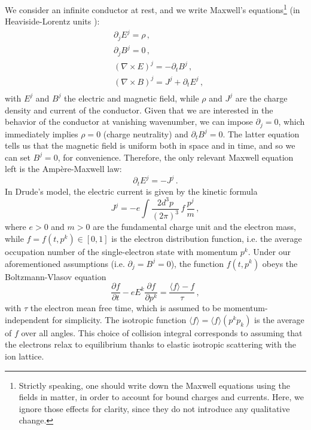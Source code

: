 \documentclass[a4paper, amsfonts, amssymb, amsmath, reprint, showkeys, nofootinbib, twoside,notitlepage,onecolumn]{revtex4-1}
\theoremstyle{definition}
\theoremstyle{theorem}
\begin{document}
We consider an infinite conductor at rest, and we write Maxwell's equations\footnote{Strictly speaking, one should write down the Maxwell equations using the fields in matter, in order to account for bound charges and currents. Here, we ignore those effects for clarity, since they do not introduce any qualitative change.} (in Heaviside-Lorentz units \cite[\S 54]{Srednicki_2007}):
\begin{equation}\label{maxwellone}
\begin{split}
& \partial_j E^j=\rho \, , \\
& \partial_j B^j=0 \, , \\
& (\nabla \times E)^j =-\partial_t B^j \, , \\
& (\nabla \times B)^j =J^j +\partial_t E^j \, , \\
\end{split}
\end{equation}
with $E^j$ and $B^j$ the electric and magnetic field, while $\rho$ and $J^j$ are the charge density and current of the conductor.
Given that we are interested in the behavior of the conductor at vanishing wavenumber, we can impose $\partial_j = 0$, which immediately implies $\rho = 0$ (charge neutrality) and $\partial_t B^j = 0$. The latter equation tells us that the magnetic field is uniform both in space and in time, and so we can set $B^j = 0$, for convenience. Therefore, the only relevant Maxwell equation left is the Amp\`{e}re-Maxwell law:
\begin{equation}\label{amperemaxwell}
\partial_t E^j=-J^j \, .
\end{equation}
In Drude's model, the electric current is given by the kinetic formula
\begin{equation}
J^j =-e \int \dfrac{2d^3 p}{(2\pi)^3} \,  f \, \dfrac{p^j}{m} \, ,
\end{equation}
where $e>0$ and $m>0$ are the fundamental charge unit and the electron mass, while $f=f(t,p^k)\in [0,1]$ is the electron distribution function, i.e. the average occupation number of the single-electron state with momentum $p^k$. Under our aforementioned assumptions (i.e. $\partial_j=B^j=0$), the function $f(t,p^k)$ obeys the Boltzmann-Vlasov equation
\begin{equation}\label{boltzmannVlasov}
\dfrac{\partial f}{\partial t}-eE^k \dfrac{\partial f}{\partial p^k} =\dfrac{\langle f\rangle -f}{\tau} \, ,
\end{equation}
with $\tau$ the electron mean free time, which is assumed to be momentum-independent for simplicity. The isotropic function $\langle f\rangle=\langle f\rangle (p^k p_k)$ is the average of $f$ over all angles. This choice of collision integral corresponds to assuming that the electrons relax to equilibrium thanks to elastic isotropic scattering with the ion lattice.
\end{document}

